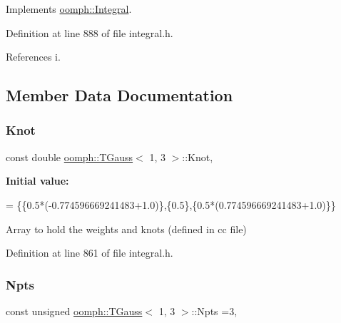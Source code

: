 Implements \hyperlink{classoomph_1_1Integral_ac65335e2aab120b285b3d6c294507b06}{oomph\+::\+Integral}.



Definition at line 888 of file integral.\+h.



References i.



\subsection{Member Data Documentation}
\mbox{\label{classoomph_1_1TGauss_3_011_00_013_01_4_a8415e912ca5b1b3ab5201ec155091a90}} 
\subsubsection{\texorpdfstring{Knot}{Knot}}
{\footnotesize\ttfamily const double \hyperlink{classoomph_1_1TGauss}{oomph\+::\+T\+Gauss}$<$ 1, 3 $>$\+::Knot\hspace{0.3cm}{\ttfamily [static]}, {\ttfamily [private]}}

{\bfseries Initial value\+:}
\begin{DoxyCode}
= 
\{\{0.5*(-0.774596669241483+1.0)\},\{0.5\},\{0.5*(0.774596669241483+1.0)\}\}
\end{DoxyCode}


Array to hold the weights and knots (defined in cc file) 



Definition at line 861 of file integral.\+h.

\mbox{\label{classoomph_1_1TGauss_3_011_00_013_01_4_ad3a9885b9b14798d71d0b96c54b0b2f4}} 
\subsubsection{\texorpdfstring{Npts}{Npts}}
{\footnotesize\ttfamily const unsigned \hyperlink{classoomph_1_1TGauss}{oomph\+::\+T\+Gauss}$<$ 1, 3 $>$\+::Npts =3\hspace{0.3cm}{\ttfamily [static]}, {\ttfamily [private]}}



